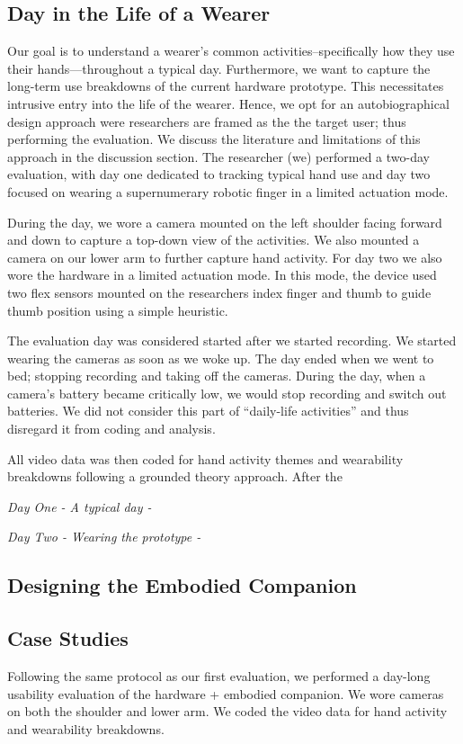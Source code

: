 \documentclass[letterpaper, 10 pt, conference]{ieeeconf}  %
\begin{document}
\subsection{Day in the Life of a Wearer}
Our goal is to understand a wearer's common activities--specifically how they use their hands---throughout a typical day. Furthermore, we want to capture the long-term use breakdowns of the current hardware prototype. This necessitates intrusive entry into the life of the wearer. Hence, we opt for an autobiographical design approach were researchers are framed as the the target user; thus performing the evaluation. We discuss the literature and limitations of this approach in the discussion section. The researcher (we) performed a two-day evaluation, with day one dedicated to tracking typical hand use and day two focused on wearing a supernumerary robotic finger in a limited actuation mode. 

During the day, we wore a camera mounted on the left shoulder facing forward and down to capture a top-down view of the activities. We also mounted a camera on our lower arm to further capture hand activity. For day two we also wore the hardware in a limited actuation mode. In this mode, the device used two flex sensors mounted on the researchers index finger and thumb to guide thumb position using a simple heuristic. 

The evaluation day was considered started after we started recording. We started wearing the cameras as soon as we woke up. The day ended when we went to bed; stopping recording and taking off the cameras. During the day, when a camera's battery became critically low, we would stop recording and switch out batteries. We did not consider this part of ``daily-life activities'' and thus disregard it from coding and analysis.

All video data was then coded for hand activity themes and wearability breakdowns following a grounded theory approach. After the 

\textit{Day One - A typical day -}

\textit{Day Two - Wearing the prototype -}




\subsection{Designing the Embodied Companion}


\subsection{Case Studies}
Following the same protocol as our first evaluation, we performed a day-long usability evaluation of the hardware + embodied companion. We wore cameras on both the shoulder and lower arm. We coded the video data for hand activity and wearability breakdowns. 
\end{document}
